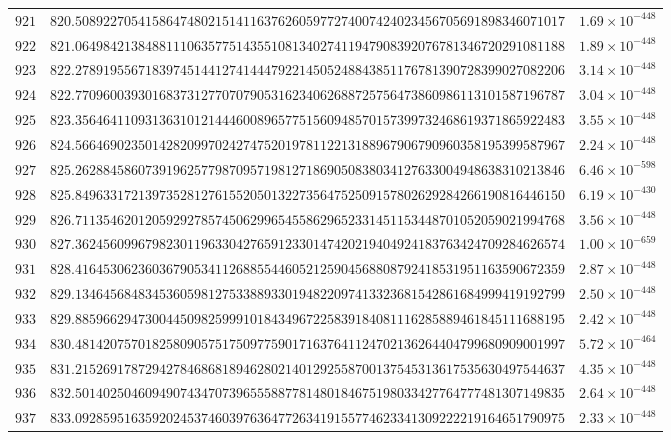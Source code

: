 \documentclass[12pt,reqno]{amsart}
\theoremstyle{remark}
\begin{document}
\begin{longtable}{clc}
$921$ & $820.5089227054158647480215141163762605977274007424023456705691898346071017$ & $1.69\times 10^{-448}$ \\
$922$ & $821.0649842138488111063577514355108134027411947908392076781346720291081188$ & $1.89\times 10^{-448}$ \\
$923$ & $822.2789195567183974514412741444792214505248843851176781390728399027082206$ & $3.14\times 10^{-448}$ \\
$924$ & $822.7709600393016837312770707905316234062688725756473860986113101587196787$ & $3.04\times 10^{-448}$ \\
$925$ & $823.3564641109313631012144460089657751560948570157399732468619371865922483$ & $3.55\times 10^{-448}$ \\
$926$ & $824.5664690235014282099702427475201978112213188967906790960358195399587967$ & $2.24\times 10^{-448}$ \\
$927$ & $825.2628845860739196257798709571981271869050838034127633004948638310213846$ & $6.46\times 10^{-598}$ \\
$928$ & $825.8496331721397352812761552050132273564752509157802629284266190816446150$ & $6.19\times 10^{-430}$ \\
$929$ & $826.7113546201205929278574506299654558629652331451153448701052059021994768$ & $3.56\times 10^{-448}$ \\
$930$ & $827.3624560996798230119633042765912330147420219404924183763424709284626574$ & $1.00\times 10^{-659}$ \\
$931$ & $828.4164530623603679053411268855446052125904568808792418531951163590672359$ & $2.87\times 10^{-448}$ \\
$932$ & $829.1346456848345360598127533889330194822097413323681542861684999419192799$ & $2.50\times 10^{-448}$ \\
$933$ & $829.8859662947300445098259991018434967225839184081116285889461845111688195$ & $2.42\times 10^{-448}$ \\
$934$ & $830.4814207570182580905751750977590171637641124702136264404799680909001997$ & $5.72\times 10^{-464}$ \\
$935$ & $831.2152691787294278468681894628021401292558700137545313617535630497544637$ & $4.35\times 10^{-448}$ \\
$936$ & $832.5014025046094907434707396555887781480184675198033427764777481307149835$ & $2.64\times 10^{-448}$ \\
$937$ & $833.0928595163592024537460397636477263419155774623341309222219164651790975$ & $2.33\times 10^{-448}$ \\

\end{longtable}
\end{document}
